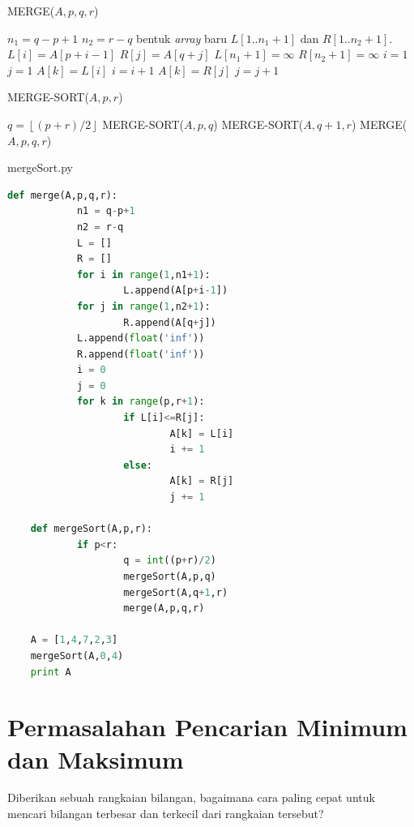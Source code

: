 \FloatBarrier
\begin{algorithm}[htbp]
	\caption{MERGE($A,p,q,r$)}
	\label{algo:merge}
	\begin{algorithmic}[1]
		\STATE $n_1 = q - p + 1$
		\STATE $n_2 = r - q$
		\STATE bentuk \textit{array} baru $L[1..n_1+1]$ dan $R[1..n_2+1]$.
			\STATE $L[i] = A[p+i-1]$
		\ENDFOR
			\STATE $R[j] = A[q+j]$
		\ENDFOR
		\STATE $L[n_1+1] = \infty$
		\STATE $R[n_2+1] = \infty$
		\STATE $i=1$
		\STATE $j=1$
				\STATE $A[k] = L[i]$
				\STATE $i = i +1$
			\ELSE
				\STATE $A[k]=R[j]$
				\STATE $j=j+1$
			\ENDIF
		\ENDFOR
	\end{algorithmic}
\end{algorithm}

\begin{algorithm}[htbp]
	\caption{MERGE-SORT($A,p,r$)}
	\label{algo:mergeSort}
	\begin{algorithmic}[1]
		\IF{$p<r$}
			\STATE $q = \left\lfloor{}(p+r)/2\right\rfloor$
			\STATE MERGE-SORT($A,p,q$)
			\STATE MERGE-SORT($A,q+1,r$)
			\STATE MERGE($A,p,q,r$) 
		\ENDIF
	\end{algorithmic}
\end{algorithm}

\FloatBarrier
\begin{listprog}{mergeSort.py}
	\label{lst:mergeSort}
	\begin{lstlisting}[language=Python]
	def merge(A,p,q,r):
			n1 = q-p+1
			n2 = r-q
			L = []
			R = []
			for i in range(1,n1+1):
					L.append(A[p+i-1])
			for j in range(1,n2+1):
					R.append(A[q+j])
			L.append(float('inf'))
			R.append(float('inf'))
			i = 0
			j = 0
			for k in range(p,r+1):
					if L[i]<=R[j]:
							A[k] = L[i]
							i += 1
					else:
							A[k] = R[j]
							j += 1

	def mergeSort(A,p,r):
			if p<r:
					q = int((p+r)/2)
					mergeSort(A,p,q)
					mergeSort(A,q+1,r)
					merge(A,p,q,r)

	A = [1,4,7,2,3]
	mergeSort(A,0,4)
	print A
	\end{lstlisting}
\end{listprog}

\FloatBarrier

\section{Permasalahan Pencarian Minimum dan Maksimum}
Diberikan sebuah rangkaian bilangan, bagaimana cara paling cepat untuk mencari bilangan terbesar dan terkecil dari rangkaian tersebut? 

